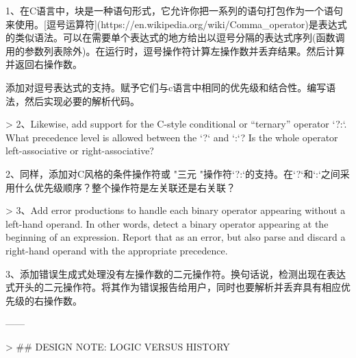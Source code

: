 \documentclass[cn,11pt,chinese]{elegantbook}
\begin{document}
1、在C语言中，块是一种语句形式，它允许你把一系列的语句打包作为一个语句来使用。[逗号运算符](https://en.wikipedia.org/wiki/Comma_operator)是表达式的类似语法。可以在需要单个表达式的地方给出以逗号分隔的表达式序列(函数调用的参数列表除外)。在运行时，逗号操作符计算左操作数并丢弃结果。然后计算并返回右操作数。

添加对逗号表达式的支持。赋予它们与c语言中相同的优先级和结合性。编写语法，然后实现必要的解析代码。

> 2、Likewise, add support for the C-style conditional or “ternary” operator `?:`. What precedence level is allowed between the `?` and `:`? Is the whole operator left-associative or right-associative?

2、同样，添加对C风格的条件操作符或 "三元 "操作符`?:`的支持。在`?`和`:`之间采用什么优先级顺序？整个操作符是左关联还是右关联？

> 3、Add error productions to handle each binary operator appearing without a left-hand operand. In other words, detect a binary operator appearing at the beginning of an expression. Report that as an error, but also parse and discard a right-hand operand with the appropriate precedence.

3、添加错误生成式处理没有左操作数的二元操作符。换句话说，检测出现在表达式开头的二元操作符。将其作为错误报告给用户，同时也要解析并丢弃具有相应优先级的右操作数。

------

> ## DESIGN NOTE: LOGIC VERSUS HISTORY
\end{document}
